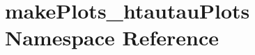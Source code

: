 \hypertarget{namespacemakePlots__htautauPlots}{
\section{makePlots\_\-htautauPlots Namespace Reference}
\label{namespacemakePlots__htautauPlots}
}
